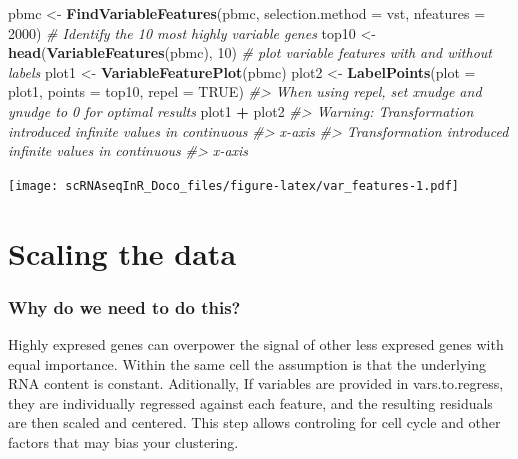 \documentclass[
]{book}
\newenvironment{Shaded}{\begin{snugshade}}{\end{snugshade}}
\newcommand{\AttributeTok}[1]{\textcolor[rgb]{0.13,0.29,0.53}{#1}}
\newcommand{\CommentTok}[1]{\textcolor[rgb]{0.56,0.35,0.01}{\textit{#1}}}
\newcommand{\ConstantTok}[1]{\textcolor[rgb]{0.56,0.35,0.01}{#1}}
\newcommand{\DecValTok}[1]{\textcolor[rgb]{0.00,0.00,0.81}{#1}}
\newcommand{\FunctionTok}[1]{\textcolor[rgb]{0.13,0.29,0.53}{\textbf{#1}}}
\newcommand{\NormalTok}[1]{#1}
\newcommand{\OtherTok}[1]{\textcolor[rgb]{0.56,0.35,0.01}{#1}}
\newcommand{\SpecialCharTok}[1]{\textcolor[rgb]{0.81,0.36,0.00}{\textbf{#1}}}
\newcommand{\StringTok}[1]{\textcolor[rgb]{0.31,0.60,0.02}{#1}}
\begin{document}
\begin{Shaded}
\begin{Highlighting}[]
\NormalTok{pbmc }\OtherTok{\textless{}{-}} \FunctionTok{FindVariableFeatures}\NormalTok{(pbmc, }\AttributeTok{selection.method =} \StringTok{\textquotesingle{}vst\textquotesingle{}}\NormalTok{, }\AttributeTok{nfeatures =} \DecValTok{2000}\NormalTok{)}
\CommentTok{\# Identify the 10 most highly variable genes}
\NormalTok{top10 }\OtherTok{\textless{}{-}} \FunctionTok{head}\NormalTok{(}\FunctionTok{VariableFeatures}\NormalTok{(pbmc), }\DecValTok{10}\NormalTok{)}
\CommentTok{\# plot variable features with and without labels}
\NormalTok{plot1 }\OtherTok{\textless{}{-}} \FunctionTok{VariableFeaturePlot}\NormalTok{(pbmc)}
\NormalTok{plot2 }\OtherTok{\textless{}{-}} \FunctionTok{LabelPoints}\NormalTok{(}\AttributeTok{plot =}\NormalTok{ plot1, }\AttributeTok{points =}\NormalTok{ top10, }\AttributeTok{repel =} \ConstantTok{TRUE}\NormalTok{)}
\CommentTok{\#\textgreater{} When using repel, set xnudge and ynudge to 0 for optimal results}
\NormalTok{plot1 }\SpecialCharTok{+}\NormalTok{ plot2}
\CommentTok{\#\textgreater{} Warning: Transformation introduced infinite values in continuous}
\CommentTok{\#\textgreater{} x{-}axis}
\CommentTok{\#\textgreater{} Transformation introduced infinite values in continuous}
\CommentTok{\#\textgreater{} x{-}axis}
\end{Highlighting}
\end{Shaded}

\texttt{[image: scRNAseqInR\_Doco\_files/figure-latex/var\_features-1.pdf]}

\hypertarget{scaling-the-data}{%
\section{Scaling the data}\label{scaling-the-data}}

\hypertarget{why-do-we-need-to-do-this-3}{%
\subsubsection*{Why do we need to do this?}\label{why-do-we-need-to-do-this-3}}

Highly expresed genes can overpower the signal of other less expresed genes with equal importance. Within the same cell the assumption is that the underlying RNA content is constant. Aditionally, If variables are provided in vars.to.regress, they are individually regressed against each feature, and the resulting residuals are then scaled and centered.
This step allows controling for cell cycle and other factors that may bias your clustering.
\end{document}
